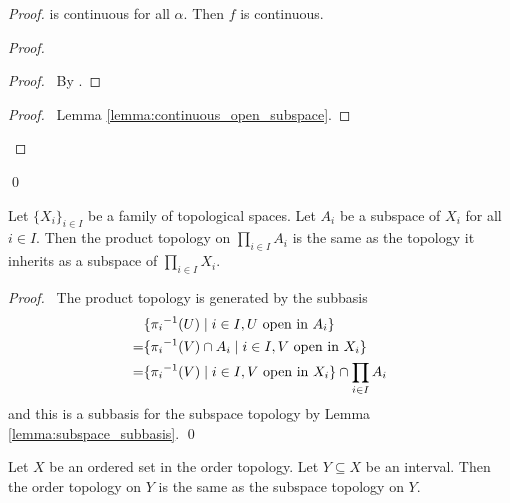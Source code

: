 \begin{proof}
{    is continuous for all $\alpha$. Then $f$ is continuous.}
    \begin{proof}
        \begin{proof}
            \pf\ By .
        \end{proof}
        \qedstep
        \begin{proof}
            \pf\ Lemma \ref{lemma:continuous_open_subspace}.
        \end{proof}
    \end{proof}
    \qed
\end{proof}

\begin{theorem}
    Let $\{ X_i \}_{i \in I}$ be a family of topological spaces. Let $A_i$ be a subspace of $X_i$ for all $i \in I$.
    Then the product topology on $\prod_{i \in I} A_i$ is the same as the topology it inherits as a subspace of
    $\prod_{i \in I} X_i$.
\end{theorem}

\begin{proof}
    \pf\ The product topology is generated by the subbasis
    \begin{align*}
        & \{ {\pi_i}^{-1}(U) \mid i \in I, U \text{ open in } A_i \} \\
        = & \{ {\pi_i}^{-1}(V) \cap A_i \mid i \in I, V \text{ open in } X_i \} \\
        = & \{ {\pi_i}^{-1}(V) \mid i \in I, V \text{ open in } X_i \} \cap \prod_{i \in I} A_i
    \end{align*}
    and this is a subbasis for the subspace topology by Lemma \ref{lemma:subspace_subbasis}. \qed
\end{proof}

\begin{theorem}
    Let $X$ be an ordered set in the order topology. Let $Y \subseteq X$ be an interval. Then the order topology
    on $Y$ is the same as the subspace topology on $Y$.
\end{theorem}


